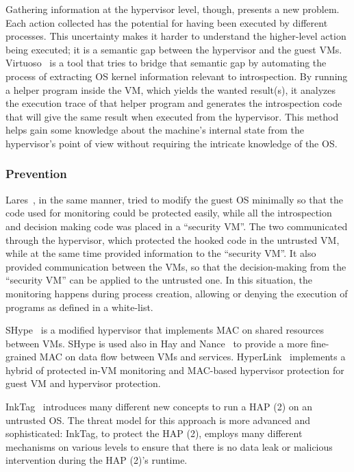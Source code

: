 \par Gathering information at the hypervisor level, though, presents a new problem. Each action collected has the potential for having been executed by different processes. This uncertainty makes it harder to understand the higher-level action being executed; it is a semantic gap between the hypervisor and the guest \ac{VM}s. Virtuoso~\cite{dolan2011virtuoso} is a tool that tries to bridge that semantic gap by automating the process of extracting \ac{OS} kernel information relevant to introspection. By running a helper program inside the \ac{VM}, which yields the wanted result(s), it analyzes the execution trace of that helper program and generates the introspection code that will give the same result when executed from the hypervisor. This method helps gain some knowledge about the machine's internal state from the hypervisor’s point of view without requiring the intricate knowledge of the \ac{OS}. 

\subsubsection{Prevention}

Lares~\cite{payne2008lares}, in the same manner, tried to modify the guest \ac{OS} minimally so that the code used for monitoring could be protected easily, while all the introspection and decision making code was placed in a ``security \ac{VM}''. The two communicated through the hypervisor, which protected the hooked code in the untrusted \ac{VM}, while at the same time provided information to the ``security \ac{VM}''. It also provided communication between the \ac{VM}s, so that the decision-making from the ``security \ac{VM}'' can be applied to the untrusted one. In this situation, the monitoring happens during process creation, allowing or denying the execution of programs as defined in a white-list.

\par SHype~\cite{sailer2005building} is a modified hypervisor that implements \ac{MAC} on shared resources between \ac{VM}s. SHype is used also in Hay and Nance~\cite{hay2008forensics} to provide a more fine-grained \ac{MAC} on data flow between \ac{VM}s and services. HyperLink~\cite{xiao2016hyperlink} implements a hybrid of protected in-\ac{VM} monitoring and \ac{MAC}-based hypervisor protection for guest \ac{VM} and hypervisor protection.

\par InkTag~\cite{hofmann2013inktag} introduces many different new concepts to run a \ac{HAP (2)} on an untrusted \ac{OS}. The threat model for this approach is more advanced and sophisticated: InkTag, to protect the \ac{HAP (2)}, employs many different mechanisms on various levels to ensure that there is no data leak or malicious intervention during the \ac{HAP (2)}'s runtime. 

